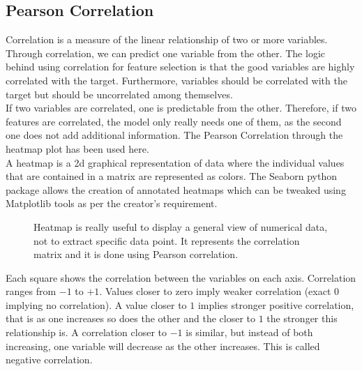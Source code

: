 \subsection{Pearson Correlation}
\label{sec:pearsoncorr}
Correlation is a measure of the linear relationship of two or more variables. Through correlation, we can predict one variable from the other. The logic behind using correlation for feature selection is that the good variables are highly correlated with the target. Furthermore, variables should be correlated with the target but should be uncorrelated among themselves. \\

\noindent If two variables are correlated, one is predictable from the other. Therefore, if two features are correlated, the model only really needs one of them, as the second one does not add additional information. The Pearson Correlation through the heatmap plot has been used here. \\

\noindent A heatmap is a \gls{2d} graphical representation of data where the individual values that are contained in a matrix are represented as colors. The Seaborn python package allows the creation of annotated heatmaps which can be tweaked using Matplotlib tools as per the creator’s requirement.

\begin{figure}[H]
	\caption[Heatmap.]{Heatmap is really useful to display a general view of numerical data, not to extract specific data point. It represents the correlation matrix and it is done using Pearson correlation.}\label{fig:correlation}
\end{figure}

\noindent Each square shows the correlation between the variables on each axis. Correlation ranges from $-1$ to $+1$. Values closer to zero imply weaker correlation (exact $0$ implying no correlation). A value closer to $1$ implies stronger positive correlation, that is as one increases so does the other and the closer to $1$ the stronger this relationship is. A correlation closer to $-1$ is similar, but instead of both increasing, one variable will decrease as the other increases. This is called negative correlation.

